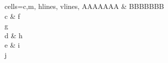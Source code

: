 \documentclass{ctexrep}%
\begin{document}
\begin{tblr}{
		cells={c,m},
		hlines,
		vlines,
	}
	AAAAAAA & BBBBBBB      \\
	c       & {f      \\g} \\ %
	d       & h            \\
	e       & {i      \\j} %
\end{tblr}
\end{document}
